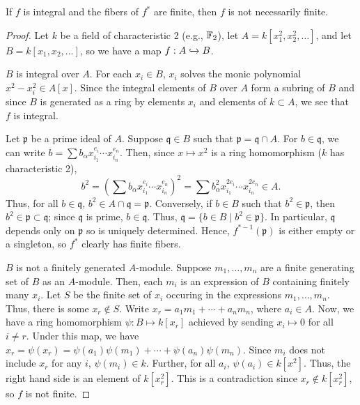 If $f$ is integral and the fibers of $f^*$ are finite, then $f$ is not necessarily finite.

\begin{proof}
Let $k$ be a field of characteristic 2 (e.g., $\mathbb{F}_2$), let $A = k[x_1^2,x_2^2,\ldots]$, and let $B = k[x_1,x_2,\ldots]$, 
so we have a map $f : A \xhookrightarrow{} B$.

$B$ is integral over $A$. For each $x_i \in B$, $x_i$ solves the monic polynomial $x^2 - x_i^2 \in A[x]$. Since the integral elements of $B$ over
$A$ form a subring of $B$ and since $B$ is generated as a ring by elements $x_i$ and elements of $k \subset A$, we see that $f$ is integral.

Let $\mathfrak{p}$ be a prime ideal of $A$. Suppose $\mathfrak{q} \in B$ such that $\mathfrak{p} = \mathfrak{q} \cap A$. For $b \in \mathfrak{q}$, we can
write $b = \sum b_{\alpha} x_{i_1}^{e_i} \cdots x_{i_n}^{e_n}$. Then, since $x \mapsto x^2$ is a ring homomorphism ($k$ has characteristic 2),
$$b^2 = \left(\sum b_{\alpha} x_{i_1}^{e_i} \cdots x_{i_n}^{e_n}\right)^2 = \sum b_{\alpha}^2 x_{i_1}^{2e_i} \cdots x_{i_n}^{2e_n} \in A.$$
Thus, for all $b \in \mathfrak{q}$, $b^2 \in A \cap \mathfrak{q} = \mathfrak{p}$. Conversely, if $b \in B$ such that $b^2 \in \mathfrak{p}$, 
then $b^2 \in \mathfrak{p} \subset \mathfrak{q}$; since $\mathfrak{q}$ is prime, $b \in \mathfrak{q}$. Thus, $\mathfrak{q} = \{b \in B \mid b^2 \in \mathfrak{p}\}$.
In particular, $\mathfrak{q}$ depends only on $\mathfrak{p}$ so is uniquely determined. Hence, $f^{*-1}(\mathfrak{p})$ is either empty or a singleton,
so $f^*$ clearly has finite fibers.

$B$ is not a finitely generated $A$-module. Suppose $m_1,\ldots,m_n$ are a finite generating set of $B$ as an $A$-module. Then, each $m_i$ is an expression
of $B$ containing finitely many $x_i$. Let $S$ be the finite set of $x_i$ occuring in the expressions $m_1,\ldots,m_n$. Thus, there is some $x_r \not\in S$.
Write $x_r = a_1 m_1 + \cdots + a_n m_n$, where $a_i \in A$. Now, we have a ring homomorphism $\psi : B \mapsto k[x_r]$ achieved by sending $x_i \mapsto 0$
for all $i \neq r$. Under this map, we have $x_r = \psi(x_r) = \psi(a_1)\psi(m_1) + \cdots + \psi(a_n) \psi(m_n)$. Since $m_i$ does not include $x_r$ for any 
$i$, $\psi(m_i) \in k$. Further, for all $a_i$, $\psi(a_i) \in k[x^2]$. Thus, the right hand side is an element of $k[x_r^2]$. This is a contradiction since
$x_r \not\in k[x_r^2]$, so $f$ is not finite.
\end{proof}

